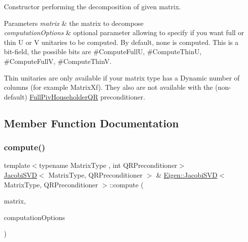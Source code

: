 Constructor performing the decomposition of given matrix. 


\begin{DoxyParams}{Parameters}
{\em matrix} & the matrix to decompose \\
\hline
{\em computation\+Options} & optional parameter allowing to specify if you want full or thin U or V unitaries to be computed. By default, none is computed. This is a bit-\/field, the possible bits are \#\+Compute\+FullU, \#\+Compute\+ThinU, \#\+Compute\+FullV, \#\+Compute\+ThinV.\\
\hline
\end{DoxyParams}
Thin unitaries are only available if your matrix type has a Dynamic number of columns (for example Matrix\+Xf). They also are not available with the (non-\/default) \mbox{\hyperlink{class_eigen_1_1_full_piv_householder_q_r}{Full\+Piv\+Householder\+QR}} preconditioner. 

\subsection{Member Function Documentation}
\mbox{\label{class_eigen_1_1_jacobi_s_v_d_a5dab376cc86cf0d36674bcdad4af3f5a}} 
\subsubsection{\texorpdfstring{compute()}{compute()}\hspace{0.1cm}{\footnotesize\ttfamily [1/2]}}
{\footnotesize\ttfamily template$<$typename Matrix\+Type , int Q\+R\+Preconditioner$>$ \\
\mbox{\hyperlink{class_eigen_1_1_jacobi_s_v_d}{Jacobi\+S\+VD}}$<$ Matrix\+Type, Q\+R\+Preconditioner $>$ \& \mbox{\hyperlink{class_eigen_1_1_jacobi_s_v_d}{Eigen\+::\+Jacobi\+S\+VD}}$<$ Matrix\+Type, Q\+R\+Preconditioner $>$\+::compute (\begin{DoxyParamCaption}\item[{const Matrix\+Type \&}]{matrix,  }\item[{unsigned int}]{computation\+Options }\end{DoxyParamCaption})}



